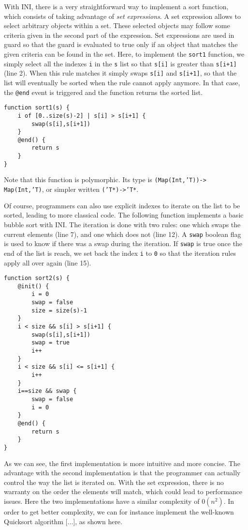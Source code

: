 \documentclass[11pt]{article}
\begin{document}
With INI, there is a very straightforward way to implement a sort function, which consists of taking advantage of \emph{set expressions}. A set expression allows to select arbitrary objects within a set. These selected objects may follow some criteria given in the second part of the expression. Set expressions are used in guard so that the guard is evaluated to true only if an object that matches the given criteria can be found in the set. Here, to implement the \texttt{sort1} function, we simply select all the indexes \texttt{i} in the \texttt{s} list so that \texttt{s[i]} is greater than \texttt{s[i+1]} (line 2). When this rule matches it simply swaps \texttt{s[i]} and \texttt{s[i+1]}, so that the list will eventually be sorted when the rule cannot apply anymore. In that case, the \texttt{@end} event is triggered and the function returns the sorted list.

\begin{lstlisting}
function sort1(s) {
	i of [0..size(s)-2] | s[i] > s[i+1] {
		swap(s[i],s[i+1])
	}
	@end() {
		return s
	}
}
\end{lstlisting}

Note that this function is polymorphic. Its type is \texttt{(Map(Int,'T))->} \texttt{Map(Int,'T)}, or simpler written \texttt{('T*)->'T*}.

Of course, programmers can also use explicit indexes to iterate on the list to be sorted, leading to more classical code. The following function implements a basic bubble sort with INI. The iteration is done with two rules: one which swaps the current elements (line 7), and one which does not (line 12). A \texttt{swap} boolean flag is used to know if there was a swap during the iteration. If \texttt{swap} is true once the end of the list is reach, we set back the index \texttt{i} to \texttt{0} so that the iteration rules apply all over again (line 15).

\begin{lstlisting}
function sort2(s) {
	@init() {
		i = 0
		swap = false
		size = size(s)-1
	}
	i < size && s[i] > s[i+1] {
		swap(s[i],s[i+1])
		swap = true
		i++
	}
	i < size && s[i] <= s[i+1] {
		i++
	}
	i==size && swap {
		swap = false
		i = 0
	}
	@end() {
		return s
	}
}
\end{lstlisting}

As we can see, the first implementation is more intuitive and more concise. The advantage with the second implementation is that the programmer can actually control the way the list is iterated on. With the set expression, there is no warranty on the order the elements will match, which could lead to performance issues. Here the two implementations have a similar complexity of $0(n^2)$. In order to get better complexity, we can for instance implement the well-known Quicksort algorithm [...], as shown here.
\end{document}
